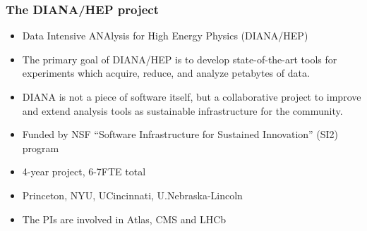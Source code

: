 \begin{frame}
\frametitle{The DIANA/HEP project}

\begin{itemize}
\item Data Intensive ANAlysis for High Energy Physics (DIANA/HEP)
\item The primary goal of DIANA/HEP is to develop state-of-the-art tools for experiments which acquire, reduce, and analyze petabytes of data.
\item DIANA is not a piece of software itself, but a collaborative project to improve and extend analysis tools as sustainable infrastructure for the community.
\item Funded by NSF ``Software Infrastructure for Sustained Innovation'' (SI2) program
\item 4-year project, 6-7FTE total
\item Princeton, NYU, UCincinnati, U.Nebraska-Lincoln
\item The PIs are involved in Atlas, CMS and LHCb
\end{itemize}

\end{frame}


